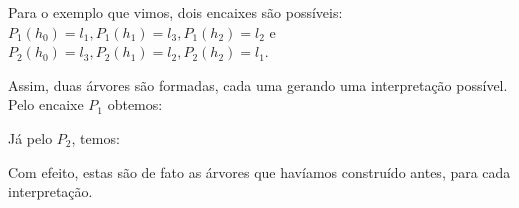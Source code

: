 Para o exemplo que vimos, dois encaixes são possíveis: $P_1(h_0) = l_1, P_1(h_1) = l_3, P_1(h_2) = l_2$ e $P_2(h_0) = l_3, P_2(h_1) = l_2, P_2(h_2) = l_1$.

Assim, duas árvores são formadas, cada uma gerando uma interpretação possível. Pelo encaixe $P_1$ obtemos:

\begin{center}
\end{center}

Já pelo $P_2$, temos:

\begin{center}
\end{center}

Com efeito, estas são de fato as árvores que havíamos construído antes, para cada interpretação.

